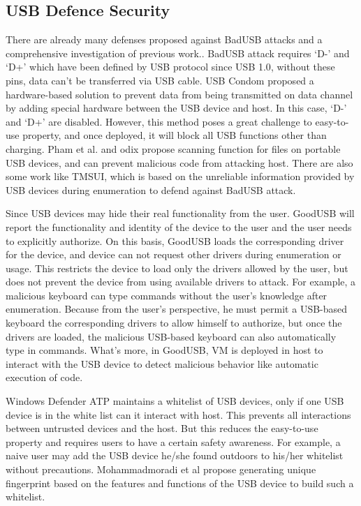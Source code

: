 \subsection{USB Defence Security}
\label{subsec:usb_defence}
There are already many defenses proposed against BadUSB attacks and a comprehensive investigation of previous work.\cite{sok}.
BadUSB attack requires `D-' and `D+' which have been defined by USB protocol since USB 1.0\cite{usb10},
without these pins, data can't be transferred via USB cable. USB Condom \cite{Condom} proposed a hardware-based solution to prevent data from being transmitted on data channel by adding special hardware between the USB device and host. In this case, `D-' and `D+' are disabled.
However, this method poses a great challenge to easy-to-use property, and once deployed, it will block all USB functions other than charging. Pham et al. \cite{pham2010optimizing} and odix\cite{OLEA} propose scanning function for files on portable USB devices, and can prevent malicious code from attacking host.
There are also some work like TMSUI\cite{yang2015tmsui}, which is based on the unreliable information provided by USB devices during enumeration to defend against BadUSB attack.

Since USB devices may hide their real functionality from the user. GoodUSB\cite{tian2015defending} will report the functionality and identity of the device to the user and the user needs to explicitly authorize. On this basis, GoodUSB loads the corresponding driver for the device, and device can not request other drivers during enumeration or usage. This restricts the device to load only the drivers allowed by the user, but does not prevent the device from using available drivers to attack. For example, a malicious keyboard can type commands without the user's knowledge after enumeration. Because from the user's perspective, he must permit a USB-based keyboard the corresponding drivers to allow himself to authorize, but once the drivers are loaded, the malicious USB-based keyboard can also automatically type in commands. What's more, in GoodUSB, VM is deployed in host to interact with the USB device to detect malicious behavior like automatic execution of code.
 
Windows Defender ATP\cite{windenfenderwhite} maintains a whitelist of USB devices, only if one USB device is in the white list can it interact with host. This prevents all interactions between untrusted devices and the host. But this reduces the easy-to-use property and requires users to have a certain safety awareness. For example, a naive user may add the USB device he/she found outdoors to his/her whitelist without precautions. Mohammadmoradi et al\cite{mohammadmoradi2018making} propose generating unique fingerprint based on the features and functions of the USB device to build such a whitelist.

